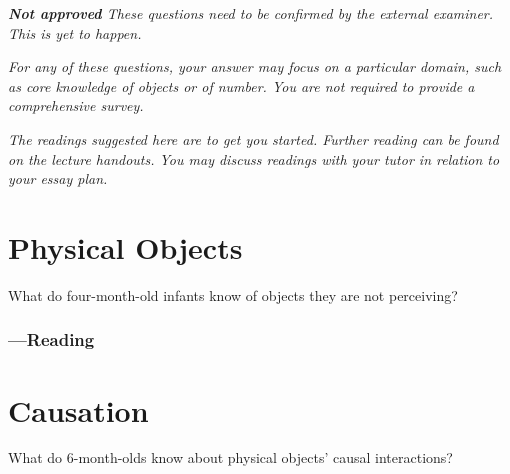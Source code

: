 \documentclass[12pt,\papersize]{extarticle}
\begin{document}
\setlength\footnotesep{1em}


\maketitle

\setcounter{tocdepth}{1}

\noindent


\textit{\textbf{Not approved}
These questions need to be confirmed by the external examiner.  This is yet to happen.}


\textit{For any of these questions, your answer may focus on a particular domain, such as core knowledge of objects or of number.  You are not required to provide a comprehensive survey.}

\emph{The readings suggested here are to get you started.  Further reading can be found on the lecture handouts.  You may discuss readings with your tutor in relation to your essay plan.}

\minitoc

\tableofcontents
\clearpage

\section{Physical Objects}
What do four-month-old infants know of objects they are not perceiving?

\subsubsection{---Reading}









\clearpage

\section{Causation}

What do 6-month-olds know about physical objects’ causal interactions?
\end{document}
